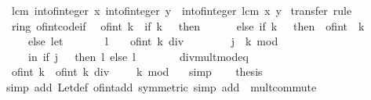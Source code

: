 \begin{isabellebody}
\ \ {\isachardoublequoteopen}lcm\ {\isacharparenleft}int{\isacharunderscore}of{\isacharunderscore}integer\ x{\isacharparenright}\ {\isacharparenleft}int{\isacharunderscore}of{\isacharunderscore}integer\ y{\isacharparenright}\ {\isacharequal}\ int{\isacharunderscore}of{\isacharunderscore}integer\ {\isacharparenleft}lcm\ x\ y{\isacharparenright}{\isachardoublequoteclose}\isanewline
%
\isadelimproof
%
\endisadelimproof
%
\isatagproof
{}\isamarkupfalse%
\ transfer\ rule%
\endisatagproof
{\isafoldproof}%
%
\isadelimproof
\isanewline
%
\endisadelimproof
\isanewline
{}\isamarkupfalse%
\isanewline
\isanewline
{}\isamarkupfalse%
\ {\isacharparenleft}\ ring{\isacharunderscore}{}{\isacharparenright}\ of{\isacharunderscore}int{\isacharunderscore}code{\isacharunderscore}if{\isacharcolon}\isanewline
\ \ {\isachardoublequoteopen}of{\isacharunderscore}int\ k\ {\isacharequal}\ {\isacharparenleft}if\ k\ {\isacharequal}\ {}\ then\ {}\isanewline
\ \ \ \ \ else\ if\ k\ {\isacharless}\ {}\ then\ {\isacharminus}\ of{\isacharunderscore}int\ {\isacharparenleft}{\isacharminus}\ k{\isacharparenright}\isanewline
\ \ \ \ \ else\ let\isanewline
\ \ \ \ \ \ \ l\ {\isacharequal}\ {}\ {\isacharasterisk}\ of{\isacharunderscore}int\ {\isacharparenleft}k\ div\ {}{\isacharparenright}{\isacharsemicolon}\isanewline
\ \ \ \ \ \ \ j\ {\isacharequal}\ k\ mod\ {}\isanewline
\ \ \ \ \ in\ if\ j\ {\isacharequal}\ {}\ then\ l\ else\ l\ {\isacharplus}\ {}{\isacharparenright}{\isachardoublequoteclose}\isanewline
%
\isadelimproof
%
\endisadelimproof
%
\isatagproof
{}\isamarkupfalse%
\ {\isacharminus}\isanewline
\ \ \isamarkupfalse%
\ div{\isacharunderscore}mult{\isacharunderscore}mod{\isacharunderscore}eq\ \isamarkupfalse%
\ {\isacharasterisk}{\isacharcolon}\ {\isachardoublequoteopen}of{\isacharunderscore}int\ k\ {\isacharequal}\ of{\isacharunderscore}int\ {\isacharparenleft}k\ div\ {}\ {\isacharasterisk}\ {}\ {\isacharplus}\ k\ mod\ {}{\isacharparenright}{\isachardoublequoteclose}\ \isamarkupfalse%
\ simp\isanewline
\ \ \isamarkupfalse%
\ {\isacharquery}thesis\isanewline
\ \ \ \ \isamarkupfalse%
\ {\isacharparenleft}simp\ add{\isacharcolon}\ Let{\isacharunderscore}def\ of{\isacharunderscore}int{\isacharunderscore}add\ {\isacharbrackleft}symmetric{\isacharbrackright}{\isacharparenright}\ {\isacharparenleft}simp\ add{\isacharcolon}\ {\isacharasterisk}\ mult{\isachardot}commute{\isacharparenright}\isanewline

\end{isabellebody}
